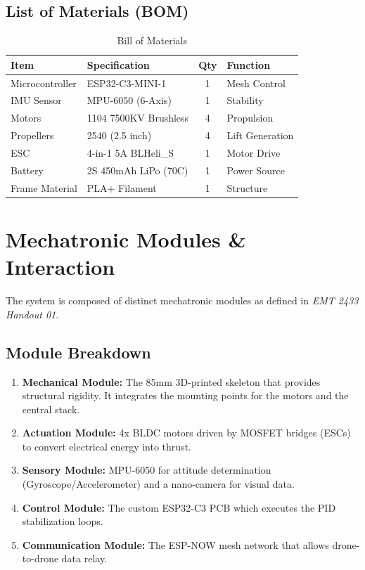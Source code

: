 \documentclass[12pt, a4paper]{article}
\begin{document}
\subsection{List of Materials (BOM)}
\begin{table}[H]
    \centering
    \begin{tabular}{@{}llcl@{}}
    \toprule
    \textbf{Item} & \textbf{Specification} & \textbf{Qty} & \textbf{Function} \\ \midrule
    Microcontroller & ESP32-C3-MINI-1 & 1 & Mesh Control \\
    IMU Sensor & MPU-6050 (6-Axis) & 1 & Stability \\
    Motors & 1104 7500KV Brushless & 4 & Propulsion \\
    Propellers & 2540 (2.5 inch) & 4 & Lift Generation \\
    ESC & 4-in-1 5A BLHeli\_S & 1 & Motor Drive \\
    Battery & 2S 450mAh LiPo (70C) & 1 & Power Source \\
    Frame Material & PLA+ Filament & 1 & Structure \\
    \bottomrule
    \end{tabular}
    \caption{Bill of Materials}
\end{table}

\newpage

\section{Mechatronic Modules \& Interaction}

The system is composed of distinct mechatronic modules as defined in \textit{EMT 2433 Handout 01}.

\subsection{Module Breakdown}
\begin{enumerate}
    \item \textbf{Mechanical Module:} The 85mm 3D-printed skeleton that provides structural rigidity. It integrates the mounting points for the motors and the central stack.
    \item \textbf{Actuation Module:} 4x BLDC motors driven by MOSFET bridges (ESCs) to convert electrical energy into thrust.
    \item \textbf{Sensory Module:} MPU-6050 for attitude determination (Gyroscope/Accelerometer) and a nano-camera for visual data.
    \item \textbf{Control Module:} The custom ESP32-C3 PCB which executes the PID stabilization loops.
    \item \textbf{Communication Module:} The ESP-NOW mesh network that allows drone-to-drone data relay.
\end{enumerate}
\end{document}
